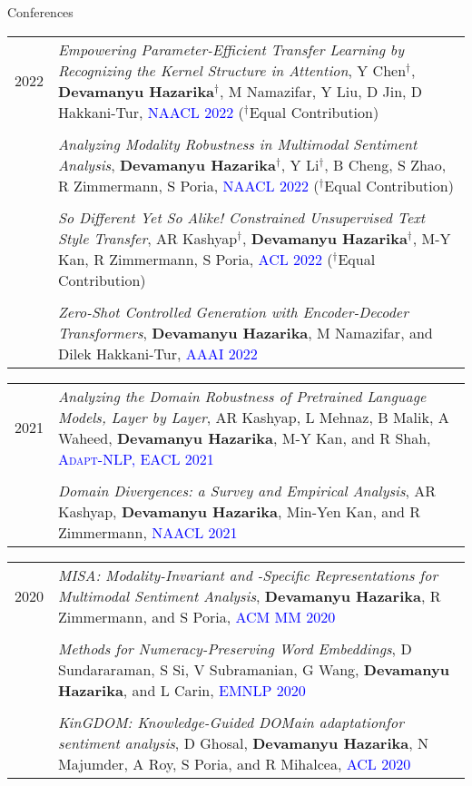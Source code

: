 \documentclass[a4paper,10pt]{article}
\begin{document}
Conferences

\begin{tabular}{R{1cm}| L{12cm}}
    2022  & \textit{Empowering Parameter-Efficient Transfer Learning by Recognizing the Kernel Structure in Attention}, 
    \small{Y Chen$^{\dagger}$, \textbf{Devamanyu Hazarika}$^{\dagger}$, M Namazifar, Y Liu, D Jin, D Hakkani-Tur}, \textcolor{blue}{\textsc{NAACL 2022}} ($^{\dagger}$Equal Contribution) 
    \\
    \\
    & \textit{Analyzing Modality Robustness in Multimodal Sentiment Analysis}, 
    \small{\textbf{Devamanyu Hazarika}$^{\dagger}$, Y Li$^{\dagger}$, B Cheng, S Zhao, R Zimmermann, S Poria}, \textcolor{blue}{\textsc{NAACL 2022}} ($^{\dagger}$Equal Contribution) 
    \\
    \\
    & \textit{So Different Yet So Alike!
    Constrained Unsupervised Text Style Transfer}, \small{AR Kashyap$^{\dagger}$, \textbf{Devamanyu Hazarika}$^{\dagger}$, M-Y Kan, R Zimmermann, S Poria}, \textcolor{blue}{\textsc{ACL 2022}} ($^{\dagger}$Equal Contribution) 
    \\
    \\
    & \textit{Zero-Shot Controlled Generation with Encoder-Decoder Transformers},  \small{\textbf{Devamanyu Hazarika}, M Namazifar, and Dilek Hakkani-Tur}, \textcolor{blue}{\textsc{AAAI 2022}} 
    \\
\end{tabular}
    
\begin{tabular}{R{1cm}| L{12cm}}
    2021  & \textit{Analyzing the Domain Robustness of Pretrained Language Models, Layer by Layer}, \small{AR Kashyap, L Mehnaz, B Malik, A Waheed, \textbf{Devamanyu Hazarika}, M-Y Kan, and R Shah},  \textcolor{blue}{\textsc{Adapt-NLP, EACL 2021}} 
    \\
    \\
    & \textit{Domain Divergences: a Survey and Empirical Analysis}, \small{AR Kashyap, \textbf{Devamanyu Hazarika}, Min-Yen Kan, and R Zimmermann},  \textcolor{blue}{\textsc{NAACL 2021}} 
    \\
\end{tabular}
    
\begin{tabular}{R{1cm}| L{12cm}}
    2020 & \textit{MISA: Modality-Invariant and -Specific Representations for Multimodal Sentiment Analysis}, \small{\textbf{Devamanyu Hazarika}, R Zimmermann, and S Poria},  \textcolor{blue}{\textsc{ACM MM 2020}} \\
    \\
    & \textit{Methods for Numeracy-Preserving Word Embeddings}, \small{D Sundararaman, S Si, V Subramanian, G Wang, \textbf{Devamanyu Hazarika}, and L Carin},  \textcolor{blue}{\textsc{EMNLP 2020}} \\
    \\
    & \textit{KinGDOM: Knowledge-Guided DOMain adaptationfor sentiment analysis}, \small{D Ghosal, \textbf{Devamanyu Hazarika}, N Majumder, A Roy, S Poria, and R Mihalcea},  \textcolor{blue}{\textsc{ACL 2020}} \\
\end{tabular}
    
\end{document}
